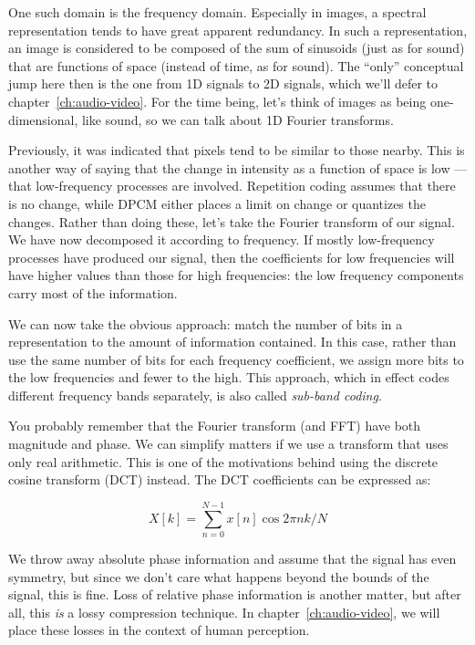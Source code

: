 One such domain is the frequency domain. Especially in images, a
spectral representation tends to have great apparent redundancy.  In
such a representation, an image is considered to be composed of the
sum of sinusoids (just as for sound) that are functions of space
(instead of time, as for sound).  The ``only'' conceptual jump here
then is the one from 1D signals to 2D signals, which we'll defer to
chapter~\ref{ch:audio-video}. For the time being, let's think of
images as being one-dimensional, like sound, so we can talk about 1D
Fourier transforms.

Previously, it was indicated that pixels tend to be similar to those nearby.
This is another way of saying that the change in intensity as a
function of space is low --- that low-frequency processes are
involved.  Repetition coding assumes that there is no change, while
DPCM either places a limit on change or quantizes the changes. Rather
than doing these, let's take the Fourier transform of our signal. We
have now decomposed it according to frequency. If mostly low-frequency
processes have produced our signal, then the coefficients for low
frequencies will have higher values than those for high
frequencies: the low frequency components carry most of the
information.

We can now take the obvious approach: match the number of bits in a
representation to the amount of information contained.  In this case,
rather than use the same number of bits for each frequency
coefficient, we assign more bits to the low frequencies and fewer to
the high.  This approach, which in effect codes different frequency
bands separately, is also called \emph{sub-band coding}.

You probably remember that the Fourier transform (and FFT) have both
magnitude and phase.  We can simplify matters if we use a transform
that uses only real arithmetic.  This is one of the motivations behind
using the discrete cosine transform (DCT) instead.  The DCT
coefficients can be expressed as:

\begin{equation}
X[k] = \sum_{n=0}^{N-1} x[n] \cos2\pi n k/N
\end{equation}

We throw away absolute phase information and assume that the signal
has even symmetry, but since we don't care what happens beyond the
bounds of the signal, this is fine.  Loss of relative phase
information is another matter, but after all, this \emph{is} a lossy
compression technique. In chapter~\ref{ch:audio-video}, we will place
these losses in the context of human perception.

